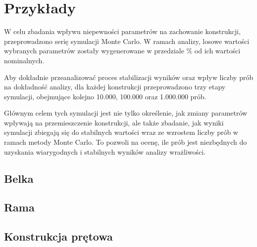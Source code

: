 \section{Przykłady}

W celu zbadania wpływu niepewności parametrów na zachowanie konstrukcji, przeprowadzono serię symulacji Monte Carlo.
W ramach analizy, losowe wartości wybranych parametrów zostały wygenerowane w przedziale \% od ich wartości nominalnych.

Aby dokładnie przeanalizować proces stabilizacji wyników oraz wpływ liczby prób na dokładność analizy,
dla każdej konstrukcji przeprowadzono trzy etapy symulacji, obejmujące kolejno 10.000, 100.000 oraz 1.000.000 prób.

Głównym celem tych symulacji jest nie tylko określenie, jak zmiany parametrów wpływają na przemieszczenie konstrukcji,
ale także zbadanie, jak wyniki symulacji zbiegają się do stabilnych wartości wraz ze wzrostem liczby prób w ramach metody Monte Carlo.
To pozwoli na ocenę, ile prób jest niezbędnych do uzyskania wiarygodnych i stabilnych wyników analizy wrażliwości.

\subsection{Belka}

\newpage

\subsection{Rama}

\newpage

\subsection{Konstrukcja prętowa}
